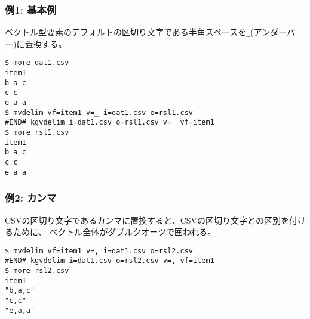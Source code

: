 \subsubsection*{例1: 基本例}

ベクトル型要素のデフォルトの区切り文字である半角スペースを\verb|_|(アンダーバー)に置換する。


\begin{Verbatim}[baselinestretch=0.7,frame=single]
$ more dat1.csv
item1
b a c
c c
e a a
$ mvdelim vf=item1 v=_ i=dat1.csv o=rsl1.csv
#END# kgvdelim i=dat1.csv o=rsl1.csv v=_ vf=item1
$ more rsl1.csv
item1
b_a_c
c_c
e_a_a
\end{Verbatim}
\subsubsection*{例2: カンマ}

CSVの区切り文字であるカンマに置換すると、CSVの区切り文字との区別を付けるために、
ベクトル全体がダブルクオーツで囲われる。


\begin{Verbatim}[baselinestretch=0.7,frame=single]
$ mvdelim vf=item1 v=, i=dat1.csv o=rsl2.csv
#END# kgvdelim i=dat1.csv o=rsl2.csv v=, vf=item1
$ more rsl2.csv
item1
"b,a,c"
"c,c"
"e,a,a"
\end{Verbatim}
